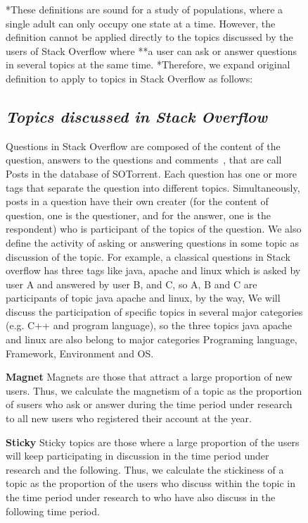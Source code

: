 \documentclass[conference]{IEEEtran}
\begin{document}
\begin{figure}[t]
*These definitions are sound for a study of populations, where a single adult can only occupy one state at a time. However, the definition cannot be applied directly to the topics discussed by the users of Stack Overflow where **a user can ask or answer questions in several topics at the same time. *Therefore, we expand original definition to apply to topics in Stack Overflow as follows:

\smallskip
\subsection*{\textit{\textbf{Topics discussed in Stack Overflow}}}

Questions in Stack Overflow are composed of the content of the question, answers to the questions and comments~\cite{liu2018mining}, that are call Posts in the database of SOTorrent. Each question has one or more tags that separate the question into different topics. Simultaneously, posts in a question have their own creater (for the content of question, one is the questioner, and for the answer, one is the respondent) who is participant of the topics of the question. We also define the activity of asking or answering questions in some topic as discussion of the topic. For example, a classical questions in Stack overflow has three tags like java, apache and linux which is asked by user A and answered by user B, and C, so A, B and C are participants of topic java apache and linux, by the way, We will discuss the participation of specific topics in several major categories (e.g. C++ and program language), so the three topics java apache and linux are also belong to major categories Programing language, Framework, Environment and OS.
\smallskip

\textbf{Magnet}
Magnets are those that attract a large proportion of new users. Thus, we calculate the magnetism of a topic as the proportion of susers who ask or answer during the time period under research to all new users who registered their account at the year.
\smallskip
\smallskip

\textbf{Sticky}
Sticky topics are those where a large proportion of the users will keep participating in discussion in the time period under research and the following. Thus, we calculate the stickiness of a topic as the proportion of the users who discuss within the topic in the time period under research to who have also discuss in the following time period.


\end{figure}
\end{document}
